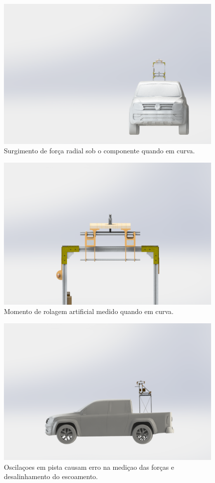 \begin{figure}[!ht]
    \centering
    \includegraphics[width=.8\linewidth]{figuras/renders/bancada_no_carro_curva_frontal.png}
    \caption{Surgimento de força radial sob o componente quando em curva\cite{autor}.}
    \label{fig:forca_radial_frontal}
\end{figure}

\begin{figure}[!ht]
    \centering
    \includegraphics[width=.8\linewidth]{figuras/renders/carro_momento_roll_frontal.png}
    \caption{Momento de rolagem artificial medido quando em curva\cite{autor}.}
    \label{fig:momento_falso_roll}
\end{figure}

\begin{figure}[!ht]
    \centering
    \includegraphics[width=.8\linewidth]{figuras/renders/bancada_no_carro_lateral.png}
    \caption{Oscilaçoes em pista causam erro na mediçao das forças e desalinhamento do escoamento\cite{autor}.}
    \label{fig:ocsilacoes_em_pista}
\end{figure}

